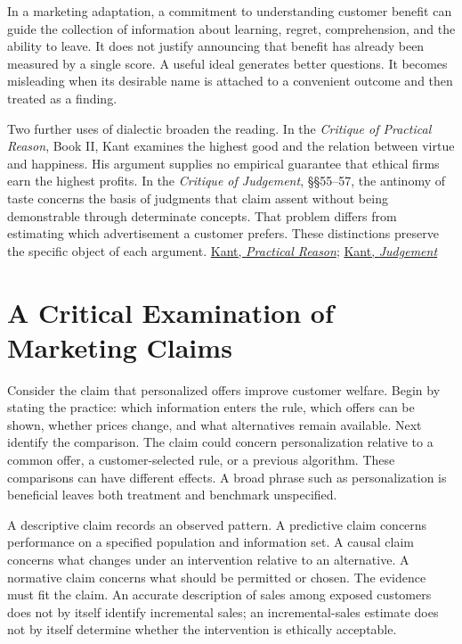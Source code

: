 In a marketing adaptation, a commitment to understanding customer
benefit can guide the collection of information about learning, regret,
comprehension, and the ability to leave. It does not justify announcing
that benefit has already been measured by a single score. A useful ideal
generates better questions. It becomes misleading when its desirable
name is attached to a convenient outcome and then treated as a finding.

Two further uses of dialectic broaden the reading. In the \emph{Critique
of Practical Reason}, Book II, Kant examines the highest good and the
relation between virtue and happiness. His argument supplies no
empirical guarantee that ethical firms earn the highest profits. In the
\emph{Critique of Judgement}, §§55--57, the antinomy of taste concerns
the basis of judgments that claim assent without being demonstrable
through determinate concepts. That problem differs from estimating which
advertisement a customer prefers. These distinctions preserve the
specific object of each argument.
\href{https://www.gutenberg.org/files/5683/5683-h/5683-h.htm}{Kant,
\emph{Practical Reason}};
\href{https://www.gutenberg.org/files/48433/48433-h/48433-h.htm}{Kant,
\emph{Judgement}}


\hypertarget{M09-a-critical-examination-of-marketing-claims}{%
\section{A Critical Examination of Marketing
Claims}\label{M09-a-critical-examination-of-marketing-claims}}

\noindent \noindent Consider the claim that personalized offers improve customer
welfare. Begin by stating the practice: which information enters the
rule, which offers can be shown, whether prices change, and what
alternatives remain available. Next identify the comparison. The claim
could concern personalization relative to a common offer, a
customer-selected rule, or a previous algorithm. These comparisons can
have different effects. A broad phrase such as personalization is
beneficial leaves both treatment and benchmark unspecified.

A descriptive claim records an observed pattern. A predictive claim
concerns performance on a specified population and information set. A
causal claim concerns what changes under an intervention relative to an
alternative. A normative claim concerns what should be permitted or
chosen. The evidence must fit the claim. An accurate description of
sales among exposed customers does not by itself identify incremental
sales; an incremental-sales estimate does not by itself determine
whether the intervention is ethically acceptable.


